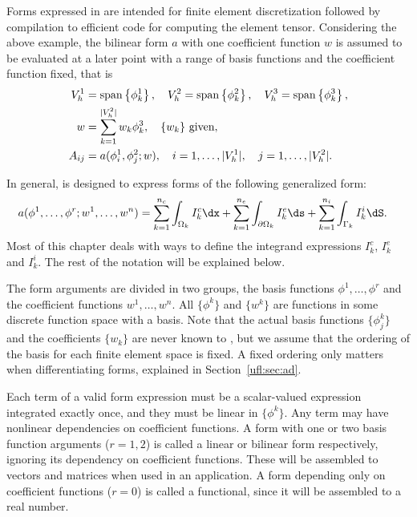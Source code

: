 Forms expressed in \ufl{} are intended for finite element
discretization followed by compilation to efficient code for computing
the element tensor.  Considering the above example, the bilinear form
$a$ with one coefficient function $w$ is assumed to be evaluated at a
later point with a range of basis functions and the coefficient
function fixed, that is
\begin{align}
V_h^1 &= \operatorname{span}\left\{ \phi_k^1 \right\}, \quad V_h^2 = \operatorname{span}\left\{ \phi_k^2 \right\}, \quad V_h^3 = \operatorname{span}\left\{ \phi_k^3 \right\}, \\
w &= \sum_{k=1}^{|V^2_h|} w_k \phi_k^3, \quad \{ w_k \} \mbox{ given}, \\
A_{ij} &= a(\phi_i^1, \phi_j^2; w),
    \quad i = 1,\ldots,|V^1_h|, \quad j = 1,\ldots,|V^2_h| . \label{ufl:eq:Aij}
\end{align}

In general, \ufl{} is designed to express forms of the following generalized form:
\begin{align} \label{ufl:eq:form_integrals}
    a(&\phi^1, \ldots, \phi^r; w^1, \ldots,  w^n) =
           \sum_{k=1}^{n_c} \int_{\Omega_k}          I^c_k \dx
         + \sum_{k=1}^{n_e} \int_{\partial\Omega_k}  I^e_k \ds
         + \sum_{k=1}^{n_i} \int_{\Gamma_k}          I^i_k \dS.
\end{align}
Most of this chapter deals with ways to define the integrand
expressions $I^c_k$, $I^e_k$ and $I^i_k$.  The rest of the notation
will be explained below.

The form arguments are divided in two groups, the basis functions
$\phi^1,\ldots,\phi^r$ and the coefficient functions $w^1,\ldots,w^n$.
All $\{ \phi^k \}$ and $\{ w^k \}$ are functions in some discrete
function space with a basis.  Note that the actual basis functions $\{
\phi_j^k \}$ and the coefficients $\{ w_k \}$ are never known to
\ufl{}, but we assume that the ordering of the basis for each finite
element space is fixed. A fixed ordering only matters when
differentiating forms, explained in Section~\ref{ufl:sec:ad}.

Each term of a valid form expression must be a scalar-valued
expression integrated exactly once, and they must be linear in $\{
\phi^k \}$.  Any term may have nonlinear dependencies on coefficient
functions.  A form with one or two basis function arguments ($r=1,2$)
is called a linear or bilinear form respectively, ignoring its
dependency on coefficient functions. These will be assembled to
vectors and matrices when used in an application.  A form depending
only on coefficient functions ($r=0$) is called a functional, since it
will be assembled to a real number.

